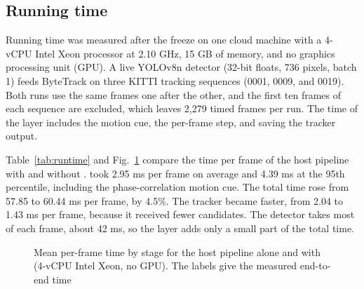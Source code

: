 

\subsection{Running time}\label{sec:latency}
\label{sec:latency-setup}Running time was measured after the freeze on one cloud machine with a 4-vCPU
Intel Xeon processor at 2.10 GHz, 15 GB of memory, and no graphics processing unit (GPU). A live YOLOv8n
detector (32-bit floats, 736 pixels, batch 1) feeds ByteTrack on three KITTI
tracking sequences (0001, 0009, and 0019). Both runs use the same frames
one after the other, and the first ten frames of each sequence are excluded,
which leaves 2,279 timed frames per run. The time of the layer includes the
motion cue, the per-frame step, and saving the tracker output.

Table~\ref{tab:runtime} and Fig.~\ref{fig:runtime} compare the time per frame
of the host pipeline with and without \scl{}. \scl{} took 2.95 ms per
frame on average and 4.39 ms at the 95th percentile, including the
phase-correlation motion cue. The total time rose from 57.85 to 60.44 ms
per frame, by 4.5\%. The tracker became faster, from 2.04 to 1.43 ms per
frame, because it received fewer candidates. The detector takes most of each
frame, about 42 ms, so the layer adds only a small part of the total time.



\begin{figure}[t]
\centering

\caption{Mean per-frame time by stage for the host pipeline alone and with
\scl{} (4-vCPU Intel Xeon, no GPU). The labels give the measured
end-to-end time}
\label{fig:runtime}
\end{figure}
